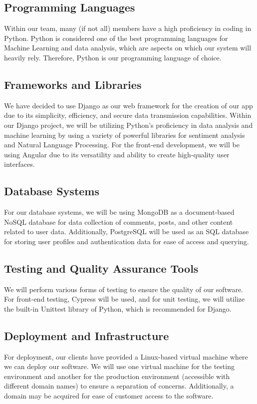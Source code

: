 \documentclass[12pt]{article}
\begin{document}
\subsection{Programming Languages}
Within our team, many (if not all) members have a high proficiency in coding in Python. Python is considered one of the best programming languages for Machine Learning and data analysis, which are aspects on which our system will heavily rely. Therefore, Python is our programming language of choice.

\subsection{Frameworks and Libraries}
We have decided to use Django as our web framework for the creation of our app due to its simplicity, efficiency, and secure data transmission capabilities. Within our Django project, we will be utilizing Python's proficiency in data analysis and machine learning by using a variety of powerful libraries for sentiment analysis and Natural Language Processing. For the front-end development, we will be using Angular due to its versatility and ability to create high-quality user interfaces.

\subsection{Database Systems}
For our database systems, we will be using MongoDB as a document-based NoSQL database for data collection of comments, posts, and other content related to user data. Additionally, PostgreSQL will be used as an SQL database for storing user profiles and authentication data for ease of access and querying.

\subsection{Testing and Quality Assurance Tools}
We will perform various forms of testing to ensure the quality of our software. For front-end testing, Cypress will be used, and for unit testing, we will utilize the built-in Unittest library of Python, which is recommended for Django.

\subsection{Deployment and Infrastructure}
For deployment, our clients have provided a Linux-based virtual machine where we can deploy our software. We will use one virtual machine for the testing environment and another for the production environment (accessible with different domain names) to ensure a separation of concerns. Additionally, a domain may be acquired for ease of customer access to the software.
\end{document}

